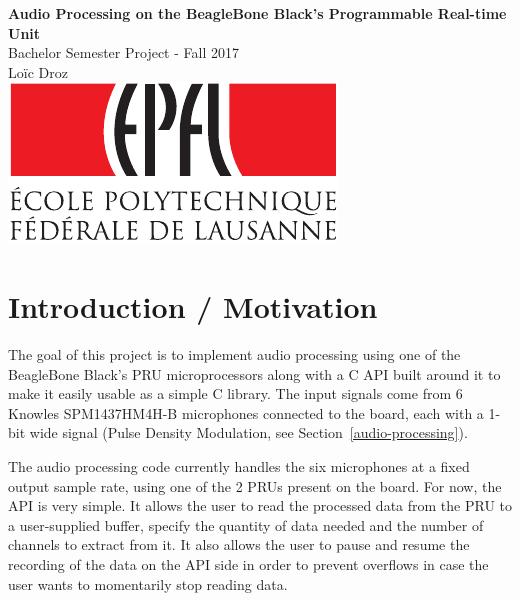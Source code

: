 \documentclass[]{report}
\begin{document}



\begin{titlepage}
	\centering
	\vspace*{50px}
	\vfill
	{
		\textbf{\LARGE Audio Processing on the BeagleBone Black's Programmable Real-time Unit}\\
		\vskip0.5cm
		{\LARGE Bachelor Semester Project - Fall 2017} \\
		\vskip2cm
		{\Large Loïc Droz}\\
	}    
	\vfill
	\vskip5cm
	\includegraphics[width=0.5\linewidth]{Pictures/epfl}
\end{titlepage}


\tableofcontents


\hypertarget{introduction-motivation}{%
\chapter{Introduction / Motivation}\label{introduction-motivation}}

The goal of this project is to implement audio processing using one of the BeagleBone Black's PRU microprocessors along with a C API built around it to make it easily usable as a simple C library. The input signals come from 6 Knowles SPM1437HM4H-B microphones connected to the board, each with a 1-bit wide signal (Pulse Density Modulation, see Section~\ref{audio-processing}).

The audio processing code currently handles the six microphones at a fixed output sample rate, using one of the 2 PRUs present on the board. For now, the API is very simple. It allows the user to read the processed data from the PRU to a user-supplied buffer, specify the quantity of data needed and the number of channels to extract from it. It also allows the user to pause and resume the recording of the data on the API side in order to prevent overflows in case the user wants to momentarily stop reading data.
\end{document}
